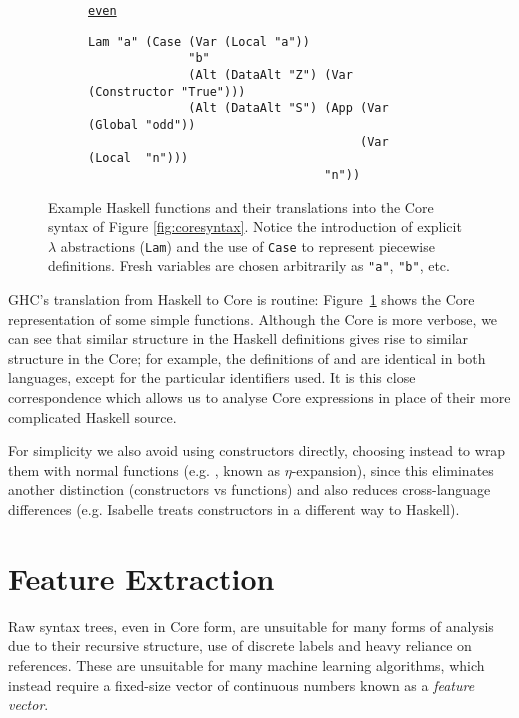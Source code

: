 \begin{figure}
\begin{subfigure}[odd]{\textwidth}
  \end{subfigure}
  \begin{subfigure}[even]{\textwidth}
    \begin{small}
      \underline{\texttt{even}}
      \begin{verbatim}
Lam "a" (Case (Var (Local "a"))
              "b"
              (Alt (DataAlt "Z") (Var (Constructor "True")))
              (Alt (DataAlt "S") (App (Var (Global "odd"))
                                      (Var (Local  "n")))
                                 "n"))
      \end{verbatim}
    \end{small}
  \end{subfigure}
  \caption{Example Haskell functions and their translations into the Core syntax
    of Figure \ref{fig:coresyntax}. Notice the introduction of explicit
    $\lambda$ abstractions (\texttt{Lam}) and the use of \texttt{Case} to
    represent piecewise definitions. Fresh variables are chosen arbitrarily
    as \texttt{"a"}, \texttt{"b"}, etc.}
  \label{fig:coreexample}
\end{figure}

GHC's translation from Haskell to Core is routine: Figure~\ref{fig:coreexample}
shows the Core representation of some simple functions. Although the Core is
more verbose, we can see that similar structure in the Haskell definitions gives
rise to similar structure in the Core; for example, the definitions of 
and  are identical in both languages, except for the particular
identifiers used. It is this close correspondence which allows us to analyse
Core expressions in place of their more complicated Haskell source.

For simplicity we also avoid using constructors directly, choosing instead to
wrap them with normal functions (e.g. , known as
$\eta$-expansion), since this eliminates another distinction (constructors vs
functions) and also reduces cross-language differences (e.g. Isabelle treats
constructors in a different way to Haskell).

\section{Feature Extraction}

Raw syntax trees, even in Core form, are unsuitable for many forms of analysis
due to their recursive structure, use of discrete labels and heavy reliance on
references. These are unsuitable for many machine learning algorithms, which
instead require a fixed-size vector of continuous numbers known as a
\emph{feature vector}.

